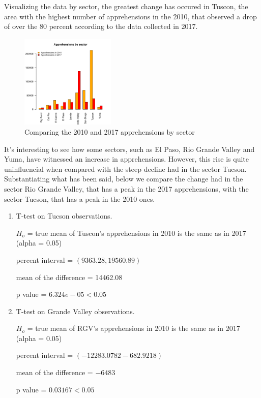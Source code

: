 \documentclass[journal, a4paper]{IEEEtran}
\begin{document}
Visualizing the data by sector, the greatest change has occured in Tuscon, the area with the highest number of apprehensions in the 2010, that observed a drop of over the 80 percent according to the data collected in 2017. 


\begin{figure}[!hbt]
  \begin{center}

    {

        \includegraphics[width=0.4\textwidth]{pdf_template3-fig2}
        \caption{Comparing the 2010 and 2017 apprehensions by sector}
    }

    \end{center}
\end{figure} 

It's interesting to see how some sectors, such as El Paso, Rio Grande Valley and Yuma, have witnessed an increase in apprehensions. However, this rise is quite uninfluencial when compared with the steep decline had in the sector Tucson. 
Substantiating what has been said, below we compare the change had in the sector Rio Grande Valley, that has a peak in the 2017 apprehensions, with the sector Tucson, that has a peak in the 2010 ones.

\begin{enumerate}

\item T-test on Tucson observations.

  \subitem $ H_{o} $ =  true mean of Tuscon's apprehensions in 2010 is the same as in 2017 (alpha = 0.05)

   percent interval = $ (9363.28,  19560.89) $

  \subitem mean of the difference = 14462.08 

  \subitem p value = $ 6.324e-05 < 0.05$

\item T-test on Grande Valley observations.

  \subitem $ H_{o} $ = true mean of RGV's apprehensions in 2010 is the same as in 2017 (alpha = 0.05)

   percent interval = $ (-12283.0782   -682.9218) $

  \subitem mean of the difference = $ -6483  $

  \subitem p value = $  0.03167 < 0.05$

\end{enumerate}
\end{document}
